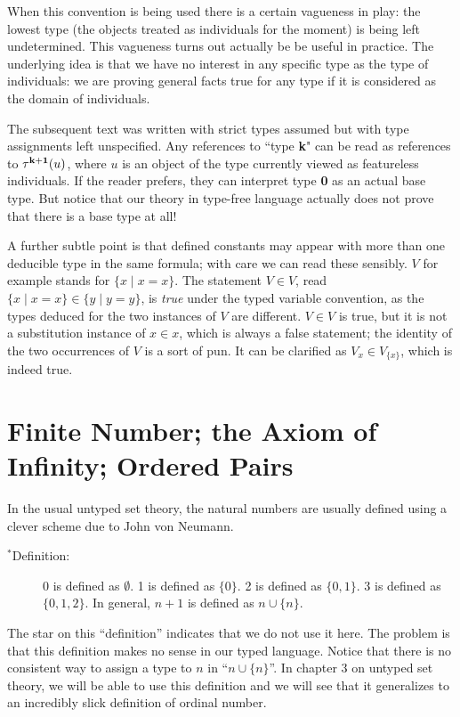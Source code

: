 \documentclass[12pt]{book}
\begin{document}
When this convention is being used there is a certain vagueness in play:  the lowest type (the objects treated as individuals for the moment) is being left undetermined.  This vagueness turns out actually be be useful in practice.  The underlying idea is that we have no interest in any specific type as the type of individuals:  we are proving general facts true for any type if it is considered as the domain of individuals.

The subsequent text was written with strict types assumed but with type assignments left unspecified.   Any references to ``type {\bf k}" can be read as references
to $\tau^{\bf k+1}(u)$, where $u$ is an object of the type currently viewed as featureless individuals.  If the reader prefers, they can interpret type {\bf 0} as an actual base type.
But notice that our theory in type-free language actually does not prove that there is a base type at all!

A further subtle point is that defined constants may appear with more than one deducible type in the same formula;  with care we can read these sensibly.  $V$ for example
stands for $\{x \mid x=x\}$.  The statement $V \in V$, read $\{x \mid x=x\} \in \{y \mid y=y\}$, is {\em true\/} under the typed variable convention, as the types deduced for the two instances of $V$ are different.  $V \in V$ is true, but it is not a substitution  instance of $x \in x$, which is always a false statement;  the identity of the two occurrences of $V$ is a sort of pun.
It can be clarified as $V_x \in V_{\{x\}}$, which is indeed true.

\newpage

\section{Finite Number; the Axiom of Infinity; Ordered Pairs}

In the usual untyped set theory, the natural numbers are usually
defined using a clever scheme due to John von Neumann.

\begin{description}

\item[$^*$Definition:] 0 is defined as $\emptyset$.  1 is defined as
$\{0\}$.  2 is defined as $\{0,1\}$.  3 is defined as $\{0,1,2\}$.  In
general, $n+1$ is defined as $n \cup \{n\}$.

\end{description}

The star on this ``definition'' indicates that we do not use it here.
The problem is that this definition makes no sense in our typed
language.  Notice that there is no consistent way to assign a type to
$n$ in ``$n \cup \{n\}$''.  In chapter 3 on untyped set theory, we
will be able to use this definition and we will see that it
generalizes to an incredibly slick definition of ordinal number.
\end{document}

